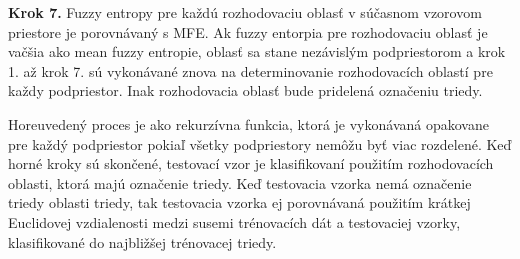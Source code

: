 \textbf{Krok 7.} Fuzzy entropy pre každú rozhodovaciu oblasť v súčasnom vzorovom priestore je porovnávaný s MFE. Ak fuzzy entorpia pre rozhodovaciu oblasť je vačšia ako mean fuzzy entropie, oblasť sa stane nezávislým podpriestorom a krok 1. až krok 7. sú vykonávané znova na determinovanie rozhodovacích oblastí pre každy podpriestor. Inak rozhodovacia oblasť bude pridelená označeniu triedy. 

Horeuvedený proces je ako rekurzívna funkcia, ktorá je vykonávaná opakovane pre každý podpriestor pokiaľ všetky podpriestory nemôžu byť viac rozdelené. Keď horné kroky sú skončené, testovací vzor je klasifikovaní použitím rozhodovacích oblasti, ktorá majú označenie triedy. Keď testovacia vzorka nemá označenie triedy oblasti triedy, tak testovacia vzorka ej porovnávaná použitím krátkej Euclidovej vzdialenosti medzi susemi trénovacích dát a testovaciej vzorky, klasifikované do najbližšej trénovacej triedy. 


